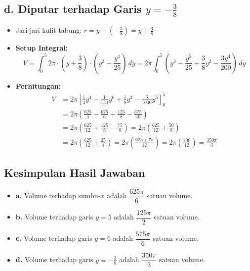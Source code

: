 \documentclass[12pt,a4paper]{article}
\begin{document}
\subsection*{d. Diputar terhadap Garis $y = -\frac{3}{8}$}
\begin{itemize}
  \item Jari-jari kulit tabung: $r = y - \left(-\frac{3}{8}\right) = y + \frac{3}{8}$
  \item \textbf{Setup Integral:}
    \begin{equation*}
      V = \int_{0}^{5} 2\pi \cdot \left(y + \frac{3}{8}\right) \cdot \left(y^2 - \frac{y^4}{25}\right) \, dy = 2\pi \int_{0}^{5} \left(y^3 - \frac{y^5}{25} + \frac{3}{8}y^2 - \frac{3y^4}{200}\right) \, dy
    \end{equation*}
  \item \textbf{Perhitungan:}
    \begin{align*}
      V &= 2\pi \left[ \frac{1}{4}y^4 - \frac{1}{150}y^6 + \frac{1}{8}y^3 - \frac{3}{1000}y^5 \right]_{0}^{5} \\
      &= 2\pi \left( \frac{625}{4} - \frac{625}{6} + \frac{125}{8} - \frac{375}{40} \right) \\
      &= 2\pi \left( \frac{625}{12} + \frac{125}{8} - \frac{75}{8} \right) = 2\pi \left( \frac{625}{12} + \frac{50}{8} \right) \\
      &= 2\pi \left( \frac{625}{12} + \frac{25}{4} \right) = 2\pi \left( \frac{625 + 75}{12} \right) = 2\pi \left( \frac{700}{12} \right) = \frac{350\pi}{3}
    \end{align*}
\end{itemize}

\subsection*{Kesimpulan Hasil Jawaban}
\begin{itemize}
  \item \textbf{a.} Volume terhadap sumbu-$x$ adalah \textbf{$\dfrac{625\pi}{6}$} satuan volume.
  \item \textbf{b.} Volume terhadap garis $y = 5$ adalah \textbf{$\dfrac{125\pi}{2}$} satuan volume.
  \item \textbf{c.} Volume terhadap garis $y = 6$ adalah \textbf{$\dfrac{575\pi}{6}$} satuan volume.
  \item \textbf{d.} Volume terhadap garis $y = -\frac{3}{8}$ adalah \textbf{$\dfrac{350\pi}{3}$} satuan volume.
\end{itemize}
\end{document}
